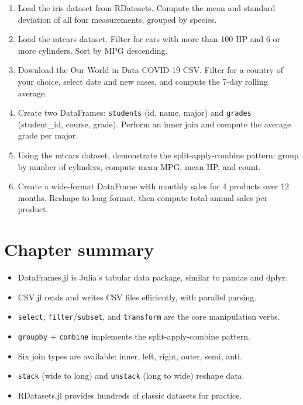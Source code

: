 \begin{exercise}
\begin{enumerate}
  \item Load the iris dataset from RDatasets. Compute the mean and standard deviation of all four measurements, grouped by species.
  \item Load the mtcars dataset. Filter for cars with more than 100 HP and 6 or more cylinders. Sort by MPG descending.
  \item Download the Our World in Data COVID-19 CSV. Filter for a country of your choice, select date and new cases, and compute the 7-day rolling average.
  \item Create two DataFrames: \texttt{students} (id, name, major) and \texttt{grades} (student\_id, course, grade). Perform an inner join and compute the average grade per major.
  \item Using the mtcars dataset, demonstrate the split-apply-combine pattern: group by number of cylinders, compute mean MPG, mean HP, and count.
  \item Create a wide-format DataFrame with monthly sales for 4 products over 12 months. Reshape to long format, then compute total annual sales per product.
\end{enumerate}
\end{exercise}

\section{Chapter summary}

\begin{itemize}
  \item DataFrames.jl is Julia's tabular data package, similar to pandas and dplyr.
  \item CSV.jl reads and writes CSV files efficiently, with parallel parsing.
  \item \texttt{select}, \texttt{filter}/\texttt{subset}, and \texttt{transform} are the core manipulation verbs.
  \item \texttt{groupby} + \texttt{combine} implements the split-apply-combine pattern.
  \item Six join types are available: inner, left, right, outer, semi, anti.
  \item \texttt{stack} (wide to long) and \texttt{unstack} (long to wide) reshape data.
  \item RDatasets.jl provides hundreds of classic datasets for practice.
\end{itemize}
